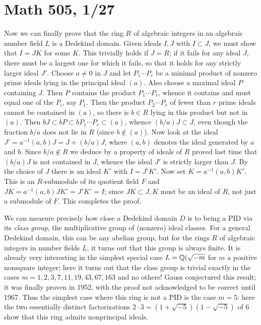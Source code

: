 \documentclass[10pt]{article}
\begin{document}
\section*{Math 505, 1/27}

Now we can finally prove that the ring $R$ of algebraic integers in an
algebraic number field $L$ is a Dedekind domain. Given ideals $I,J$ with
$I\subset J$, we must show that $I=JK$ for some $K$. This trivially
holds if $J=R$; if it fails for any ideal $J$, there must be a largest
one for which it fails, so that it holds for any strictly larger ideal
$J'$. Choose $a\ne0$ in $J$ and let $P_1\cdots P_r$ be a minimal product
of nonzero prime ideals lying in the principal ideal $(a)$. Also choose
a maximal ideal $P$ containing $J$. Then $P$ contains the product
$P_1\cdots P_r$, whence it contains and must equal one of the $P_i$, say
$P_1$. Then the product $P_2\cdots P_r$ of fewer than $r$ prime ideals
cannot be contained in $(a)$, so there is $b\in R$ lying in this product
but not in $(a)$. Then $bJ\subset bP\subset bP_1\cdots P_r\subset (a)$,
whence $(b/a)J\subset J$, even though the fraction $b/a$ does not lie in
$R$ (since $b\notin (a)$). Now look at the ideal $J' = a^{-1}(a,b)J = J
+ (b/a)J$, where $(a,b)$ denotes the ideal generated by $a$ and $b$.
Since $b/a\notin R$ we deduce by a property of ideals of $R$ proved last
time that $(b/a)J$ is not contained in $J$, whence the ideal $J'$ is
strictly larger than $J$. By the choice of $J$ there is an ideal $K'$
with $I=J'K'$. Now set $K= a^{-1}(a,b)K'$. This is an $R$-submodule of
its quotient field $F$ and $JK = a^{-1}(a,b)JK' = J'K' = I$; since
$JK\subset J, K$ must be an ideal of $R$, not just a submodule of $F$.
This completes the proof.

We can measure precisely how close a Dedekind domain $D$ is to being a
PID via its {\sl class group}, the multiplicative group of (nonzero)
ideal classes. For a general Dedekind domain, this can be any abelian
group, but for the rings $R$ of algebraic integers in number fields $L$,
it turns out that this group is always finite. It is already very
interesting in the simplest special case $L=\Bbb Q(\sqrt{-m}$ for $m$ a
positive nonsquare integer; here it turns out that the class group is
trivial exactly in the cases $m = 1,2,3,7,11,19,43,67,163$ and no
others! Gauss conjectured this result; it was finally proven in 1952,
with the proof not acknowledged to be correct until 1967. Thus the
simplest case where this ring is not a PID is the case $m=5$: here the
two essentially distinct factorizations $2\cdot 3 =
(1+\sqrt{-5})(1-\sqrt{-5})$ of 6 show that this ring admits nonprincipal
ideals.
\end{document}
